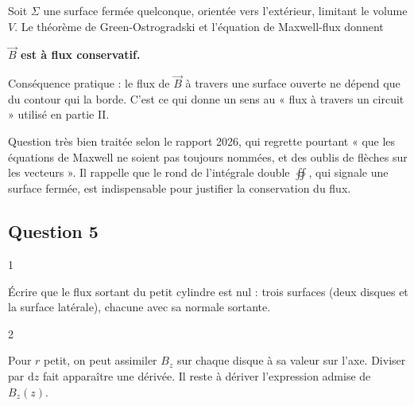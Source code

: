 \documentclass[11pt,a4paper]{article}
\newcommand{\equationajustee}[1]{%
  \sbox{\boiteequation}{$\displaystyle #1$}%
  \ifdim\wd\boiteequation>\linewidth
    \[\resizebox{\linewidth}{!}{\usebox{\boiteequation}}\]%
  \else
    \[#1\]%
  \fi}
\begin{document}
Soit \(\Sigma\) une surface fermée quelconque, orientée vers l'extérieur, limitant le volume \(V\). Le théorème de Green-Ostrogradski et l'équation de Maxwell-flux donnent

\equationajustee{\begin{aligned}
\phi_B&=\oiint_\Sigma\vec B\cdot\mathrm d\vec S\\
&=\iiint_V\operatorname{div}\vec B\,\mathrm d\tau\\
&=0 .
\end{aligned}}

\textbf{\(\vec B\) est à flux conservatif.}

\begin{methode}

Conséquence pratique : le flux de \(\vec B\) à travers une surface ouverte ne dépend que du contour qui la borde. C'est ce qui donne un sens au « flux à travers un circuit » utilisé en partie II.

\end{methode}

\begin{jury}

Question très bien traitée selon le rapport 2026, qui regrette pourtant « que les équations de Maxwell ne soient pas toujours nommées, et des oublis de flèches sur les vecteurs ». Il rappelle que le rond de l'intégrale double \(\oiint\), qui signale une surface fermée, est indispensable pour justifier la conservation du flux.

\end{jury}

\hypertarget{question-5}{%
\subsection{Question 5}\label{question-5}}

\begin{indication}{1}

Écrire que le flux sortant du petit cylindre est nul : trois surfaces (deux disques et la surface latérale), chacune avec sa normale sortante.

\end{indication}

\begin{indication}{2}

Pour \(r\) petit, on peut assimiler \(B_z\) sur chaque disque à sa valeur sur l'axe. Diviser par \(\mathrm dz\) fait apparaître une dérivée. Il reste à dériver l'expression admise de \(B_z(z)\).

\end{indication}
\end{document}
